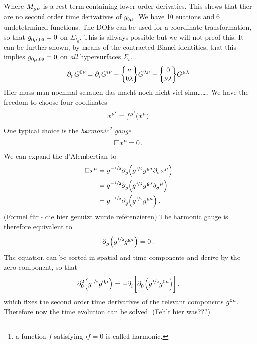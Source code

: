 Where $\tensor{M}{_\mu_\nu}$ is a rest term containing lower order derivaties.
This shows that ther are no second order time derivatives of
$\tensor{g}{_0_\mu}$. We have 10 euations and 6 undetetrmined functions. The
DOFs can be used for a coordinate transformation, so that
$\tensor{g}{_0_\mu_{,00}}=0$ on $\Sigma_{t_0}$. This is allways possible but we
will not proof this. It can be further shown, by means of the contracted Bianci
identities, that this implies $\tensor{g}{_0_\mu_{,00}}=0$ on \emph{all}
hypersurfaces $\Sigma_{t}$.
\begin{equation}
\tensor{\partial}{_0}\tensor{G}{^0^\nu}=
\tensor{\partial}{_i}\tensor{G}{^i^\nu}
-\cSym{\nu}{0}{\lambda}\tensor{G}{^\lambda^\nu}
-\cSym{0}{\nu}{\lambda}\tensor{G}{^\mu^\lambda}
\end{equation}
Hier muss man nochmal schauen das macht noch nicht viel sinn\ldots\ldots.
We have the freedom to choose four coodinates
\begin{equation}
\tensor{x}{^{\mu^\prime}}=\tensor{f}{^{\mu^\prime}}\left(\tensor{x}{^\mu}\right)
\end{equation}
One typical choice is the \emph{harmonic\footnote{a function $f$ satisfying
$\square f = 0$ is called harmonic.} gauge}
\begin{equation}
\square\tensor{x}{^\mu}=0\,.
\end{equation}
We can expand the d'Alembertian to
\begin{equation}
\begin{split}
\square\tensor{x}{^\mu}&=g^{-\nicefrac{1}{2}}\tensor{\partial}{_\varrho}\left(g^{\nicefrac{1}{2}}\tensor{g}{^\varrho^\sigma}\tensor{\partial}{_\sigma}\tensor{x}{^\mu}\right)\\
&=g^{-\nicefrac{1}{2}}\tensor{\partial}{_\varrho}\left(g^{\nicefrac{1}{2}}\tensor{g}{^\varrho^\sigma}\tensor{\delta}{_\sigma^\mu}\right)\\
&=g^{-\nicefrac{1}{2}}\tensor{\partial}{_\varrho}\left(g^{\nicefrac{1}{2}}\tensor{g}{^\varrho^\mu}\right)\,.\\
\end{split}
\end{equation}
(Formel für $\square$ die hier genutzt wurde referenzieren)
The harmonic gauge is therefore equivalent to
\begin{equation}
\tensor{\partial}{_\varrho}\left(g^{\nicefrac{1}{2}}\tensor{g}{^\varrho^\mu}\right)=0\,
.\\
\end{equation}
The equation can be sorted in spatial and time components and derive by the
zero component, so that
\begin{equation}
\tensor*{\partial}{*_0^2}\left(g^{\nicefrac{1}{2}}\tensor{g}{^0^\mu}\right)
=
-\tensor{\partial}{_i}\left[\tensor{\partial}{_0}\left(g^{\nicefrac{1}{2}}\tensor{g}{^0^\mu}\right)\right]\,
,\end{equation}
which fixes the second order time derivatives of the relevant components
$\tensor{g}{^0^\mu}$. Therefore now the time evolution can be solved. (Fehlt
hier was???)
